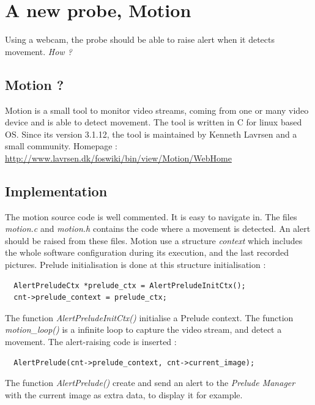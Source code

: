 \documentclass{koala-en}
\begin{document}
\section{A new probe, Motion}
Using a webcam, the probe should be able to raise alert when it detects movement. \emph{How ?}
\subsection{Motion ?}
Motion is a small tool to monitor video streams, coming from one or many video device and is able to detect movement.
\newline
\newline
The tool is written in C for linux based OS.
\newline
\newline
Since its version 3.1.12, the tool is maintained by Kenneth Lavrsen and a small community.
\newline
Homepage : \url{http://www.lavrsen.dk/foswiki/bin/view/Motion/WebHome}

\subsection{Implementation}
The motion source code is well commented. It is easy to navigate in.
\newline
\newline
The files \emph{motion.c} and \emph{motion.h} contains the code where a movement is detected. An alert should be raised from these files.
\newline
\newline
Motion use a structure \emph{context} which includes the whole software configuration during its execution, and the last recorded pictures.
Prelude initialisation is done at this structure initialisation :
\begin{lstlisting}
  AlertPreludeCtx *prelude_ctx = AlertPreludeInitCtx();
  cnt->prelude_context = prelude_ctx;
\end{lstlisting}
The function \emph{AlertPreludeInitCtx()} initialise a Prelude context.
\newline
\newline
The function \emph{motion\_loop()} is a infinite loop to capture the video stream, and detect a movement. The alert-raising code is inserted :
\begin{lstlisting}
  AlertPrelude(cnt->prelude_context, cnt->current_image);
\end{lstlisting}
The function \emph{AlertPrelude()} create and send an alert to the \emph{Prelude Manager} with the current image as extra data, to display it for example.
\end{document}
